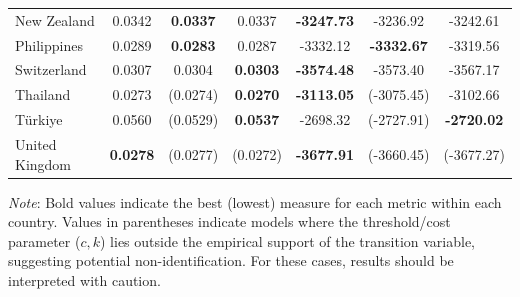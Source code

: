 \documentclass[a4paper,10pt,final]{article}    %
\begin{document}
\begin{table}[htbp]
\begin{tabular}{l|ccc|ccc}
        New Zealand    & 0.0342                                      & \textbf{0.0337}                           & 0.0337          & \textbf{-3247.73} & -3236.92          & -3242.61          \\
        Philippines    & 0.0289                                      & \textbf{0.0283}                           & 0.0287          & -3332.12          & \textbf{-3332.67} & -3319.56          \\
        Switzerland    & 0.0307                                      & 0.0304                                    & \textbf{0.0303} & \textbf{-3574.48} & -3573.40          & -3567.17          \\
        Thailand       & 0.0273                                      & (0.0274)                                  & \textbf{0.0270} & \textbf{-3113.05} & (-3075.45)        & -3102.66          \\
        Türkiye        & 0.0560                                      & (0.0529)                                  & \textbf{0.0537} & -2698.32          & (-2727.91)        & \textbf{-2720.02} \\
        United Kingdom & \textbf{0.0278 }                            & (0.0277)                                  & (0.0272)        & \textbf{-3677.91} & (-3660.45)        & (-3677.27)        \\
        \bottomrule
    \end{tabular}
    \begin{tablenotes}[para]
        \small
        \textit{Note}: Bold values indicate the best (lowest) measure for each metric within each country. Values in parentheses indicate models where the threshold/cost parameter ($c,k$) lies outside the empirical support of the transition variable, suggesting potential non-identification. For these cases, results should be interpreted with caution.
    \end{tablenotes}
\end{table}
\end{document}
